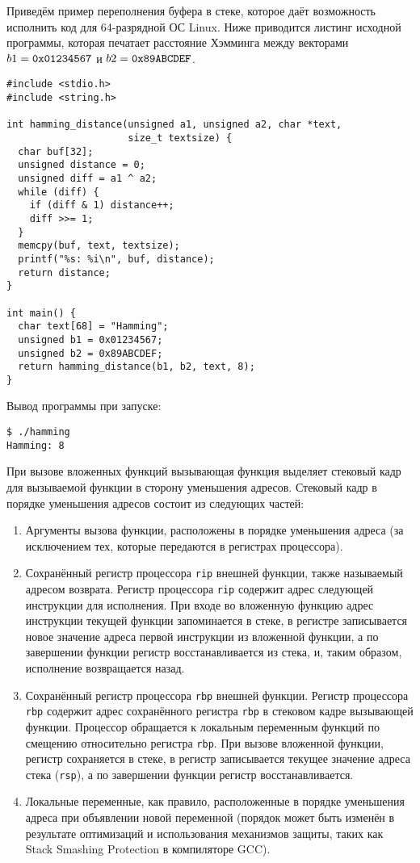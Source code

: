 Приведём пример переполнения буфера в стеке, которое даёт возможность исполнить код для 64-разрядной ОС Linux. Ниже приводится листинг исходной программы, которая печатает расстояние Хэмминга между векторами $b1 = \text{\texttt{0x01234567}}$ и $b2 = \text{\texttt{0x89ABCDEF}}$.

\begin{verbatim}
#include <stdio.h>
#include <string.h>

int hamming_distance(unsigned a1, unsigned a2, char *text,
                     size_t textsize) {
  char buf[32];
  unsigned distance = 0;
  unsigned diff = a1 ^ a2;
  while (diff) {
    if (diff & 1) distance++;
    diff >>= 1;
  }
  memcpy(buf, text, textsize);
  printf("%s: %i\n", buf, distance);
  return distance;
}

int main() {
  char text[68] = "Hamming";
  unsigned b1 = 0x01234567;
  unsigned b2 = 0x89ABCDEF;
  return hamming_distance(b1, b2, text, 8);
}
\end{verbatim}

Вывод программы при запуске:
\begin{verbatim}
$ ./hamming
Hamming: 8
\end{verbatim}

При вызове вложенных функций вызывающая функция выделяет стековый кадр для вызываемой функции в сторону уменьшения адресов. Стековый кадр в порядке уменьшения адресов состоит из следующих частей:
\begin{enumerate}
    \item Аргументы вызова функции, расположены в порядке уменьшения адреса (за исключением тех, которые передаются в регистрах процессора).
    \item Сохранённый регистр процессора \texttt{rip} внешней функции, также называемый адресом возврата. Регистр процессора \texttt{rip} содержит адрес следующей инструкции для исполнения. При входе во вложенную функцию адрес инструкции текущей функции запоминается в стеке, в регистре записывается новое значение адреса первой инструкции из вложенной функции, а по завершении функции регистр восстанавливается из стека, и, таким образом, исполнение возвращается назад.
    \item Сохранённый регистр процессора \texttt{rbp} внешней функции. Регистр процессора \texttt{rbp} содержит адрес сохранённого регистра \texttt{rbp} в стековом кадре вызывающей функции. Процессор обращается к локальным переменным функций по смещению относительно регистра \texttt{rbp}. При вызове вложенной функции, регистр сохраняется в стеке, в регистр записывается текущее значение адреса стека (\texttt{rsp}), а по завершении функции регистр восстанавливается.
    \item Локальные переменные, как правило, расположенные в порядке уменьшения адреса при объявлении новой переменной (порядок может быть изменён в результате оптимизаций и использования механизмов защиты, таких как Stack Smashing Protection в компиляторе GCC).
\end{enumerate}

